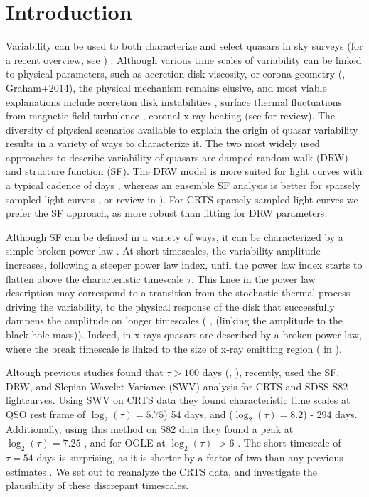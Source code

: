 \documentclass[fleqn,usenatbib]{mnras}  %
\begin{document}
\section{Introduction}
Variability can be used to both characterize and select quasars  in sky surveys (for a recent overview, see \cite{lawrence2016a}) . Although various time scales of variability can be linked to physical parameters, such as accretion disk viscosity, or corona geometry (\cite{kelly2011}, Graham+2014), the physical mechanism remains elusive, and most viable explanations include accretion disk instabilities  \citep{kawaguchi1998}, surface thermal fluctuations from magnetic field turbulence \citep{kelly2009}, coronal x-ray heating \citep{kelly2011} (see \cite{kozlowski2016} for review).
The diversity of  physical scenarios available to explain the origin of quasar variability results in a variety of ways to characterize it. The two most widely used approaches to describe variability of quasars  are damped random walk (DRW) and structure function (SF). The DRW model is more suited for light curves with a typical cadence of days \citep{zu2013, kozlowski2016}, whereas an ensemble SF analysis is better for sparsely sampled light curves \citep{hawkins2002, berk2004,   devries2005, schmidt2010, graham2014}, or review in \cite{kozlowski2016}). For CRTS sparsely sampled light curves we prefer the SF approach, as more robust  than fitting for DRW parameters.

Although SF can be defined  in a variety of ways, it can be characterized by a simple broken power law \citep{schmidt2010}. At short timescales,  the variability amplitude increases, following a steeper power law index,  until the power law index starts to flatten  above the characteristic timescale  $\tau$.   This knee in the power law  description may correspond to a transition from the stochastic thermal  process driving  the variability, to the physical response of the disk that successfully  dampens the amplitude on longer timescales (\cite{lawrence2016a, kelly2007,kelly2009, kelly2011, peterson2001} ,  (linking the amplitude to the black hole mass)). Indeed,  in x-rays quasars are described by a broken  power law, where the  break timescale is linked to the size of x-ray emitting region ( \cite{kelly2011} in \cite{graham2014}). 

Altough previous studies found that  $\tau > 100$ days  (\cite{macleod2010},  \cite{kozlowski2016}), recently, \cite{graham2014} used the SF, DRW, and Slepian Wavelet Variance (SWV) analysis for CRTS and SDSS S82 lightcurves. Using SWV on CRTS data they found characteristic time scales at   QSO rest frame of $\log_{2}(\tau) = 5.75$)  54 days,  and ($\log_{2}(\tau)=8.2$) -  294 days. Additionally, using this method on S82 data they found a peak at $\log_{2}(\tau) = 7.25$ , and for OGLE  at $\log_{2}(\tau)$ $> 6$ . The short timescale of   $\tau = 54$ days is surprising, as it is shorter by a factor of two than any previous estimates \citep{macleod2011, zu2013}. We set out to reanalyze the CRTS data, and investigate the plausibility of these discrepant timescales. 
\end{document}
